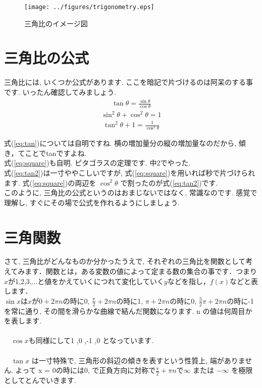 \documentclass[11pt,a4paper]{ujreport}
\begin{document}
\begin{figure}[H]
\label{im:trigonometry}
  \centering
  \texttt{[image: ../figures/trigonometry.eps]}
  \caption{三角比のイメージ図}
\end{figure}

\section{三角比の公式}
三角比には, いくつか公式があります. ここを暗記で片づけるのは阿呆のする事です. いったん確認してみましょう.
\begin{eqnarray}
\tan \theta = \frac{\sin\theta}{\cos\theta}
\label{eq:tan}
\end{eqnarray}
\begin{eqnarray}
\sin^2 \theta + \cos^2\theta = 1
\label{eq:square}
\end{eqnarray}
\begin{eqnarray}
\tan^2\theta + 1 = \frac{1}{\cos^2\theta}
\label{eq:tan2}
\end{eqnarray}

式(\ref{eq:tan})については自明ですね. 横の増加量分の縦の増加量なのだから, 傾き，てことでtanですよね.\\

式(\ref{eq:square})も自明. ピタゴラスの定理です. 中2でやった. \\

式(\ref{eq:tan2})は一寸ややこしいですが, 式(\ref{eq:square})を用いれば秒で片づけられます. 式(\ref{eq:square})の両辺を $\cos^2\theta$ で割ったのが式(\ref{eq:tan2})です.\\

このように, 三角比の公式というのはおまじないではなく, 常識なのです. 感覚で理解し, すぐにその場で公式を作れるようにしましょう. 


\section{三角関数}
さて, 三角比がどんなものか分かったうえで, それぞれの三角比を関数として考えてみます．関数とは，ある変数の値によって定まる数の集合の事です．つまり$x$が1,2,3,...と値をかえていくにつれて変化していく$y$などを指し，$f(x)$などと表します．\\

 $\sin x $は$x$が$0 + 2\pi n$の時に0, $\frac{\pi}{2} + 2\pi n$の時に1, $\pi + 2\pi n$の時に0, $\frac{3}{2}\pi + 2\pi n$の時に-1を常に通り, その間を滑らかな曲線で結んだ関数になります. n の値は何周目かを表します.\\
\\
　$\cos x $も同様にして1 ,0 ,-1 ,0 となっています. \\
\\
　$\tan x$ は一寸特殊で, 三角形の斜辺の傾きを表すという性質上, 端がありません. よって x = 0の時には0, で正負方向に対称で$\frac{\pi}{2} + \pi n$で$\infty$ または $-\infty$ を極限としてとんでいきます.\\
\end{document}
